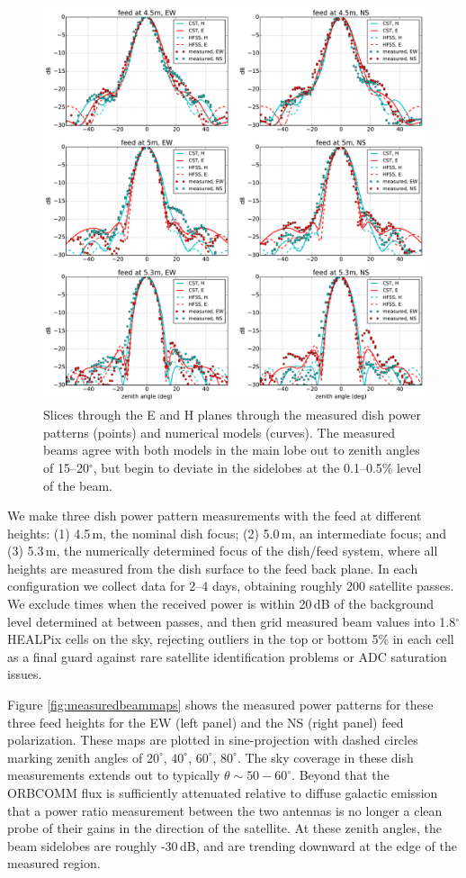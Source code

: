\documentclass{emulateapj}
\begin{document}
\begin{figure}[t]
\centering
\includegraphics[width=6.5in]{measured_beams_and_models_slices.pdf}
\caption{Slices through the E and H planes through the measured dish power patterns (points) and numerical models (curves). The measured beams agree with both models in the main lobe out to zenith angles of 15--20$^\circ$, but begin to deviate in the sidelobes at the 0.1--0.5\% level of the beam.}
\label{fig:measuredbeamslices}
\end{figure}

We make three dish power pattern measurements with the feed at different heights: (1) 4.5\,m, the nominal dish focus; (2) 5.0\,m, an intermediate focus; and (3) 5.3\,m, the numerically determined focus of the dish/feed system, where all heights are measured from the dish surface to the feed back plane. In each configuration we collect data for 2--4 days, obtaining roughly 200 satellite passes. We exclude times when the received power is within 20\,dB of the background level determined at between passes, and then grid measured beam values into 1.8$^\circ$ HEALPix cells on the sky, rejecting outliers in the top or bottom 5\% in each cell as a final guard against rare satellite identification problems or ADC saturation issues.

Figure \ref{fig:measuredbeammaps} shows the measured power patterns for these three feed heights for the EW (left panel) and the NS (right panel) feed polarization. These maps are plotted in sine-projection with dashed circles marking zenith angles of $20^\circ$, $40^\circ$, $60^\circ$, $80^\circ$. The sky coverage in these dish measurements extends out to typically $\theta\sim50-60^\circ$. Beyond that the ORBCOMM flux is sufficiently attenuated relative to diffuse galactic emission that a power ratio measurement between the two antennas is no longer a clean probe of their gains in the direction of the satellite. At these zenith angles, the beam sidelobes are roughly -30\,dB, and are trending downward at the edge of the measured region.
\end{document}
